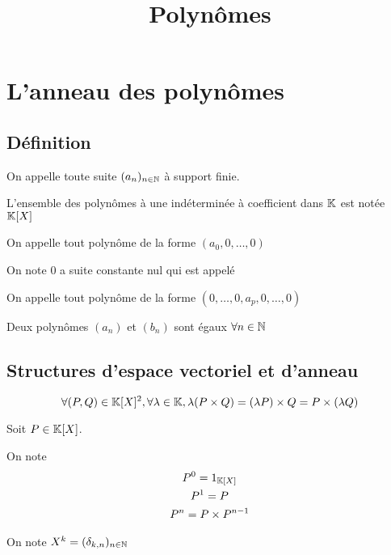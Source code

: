 

\title{Polynômes}



\section{L'anneau des polynômes}

\subsection{Définition}

\begin{dfn}
  On appelle  toute suite $(a_n)_{n \in \mathbb{N}}$
  à support finie.
\end{dfn}

\begin{dfn}
  L'ensemble des polynômes à une indéterminée à coefficient dans $\mathbb{K}$ est notée $\mathbb{K}[X]$ 

  On appelle  tout polynôme de la forme $(a_0, 0, \ldots, 0)$

  On note $0$ a suite constante nul qui est appelé 

  On appelle  tout polynôme de la forme $(0, \ldots, 0, a_p, 0, \ldots, 0)$

  Deux polynômes $(a_n)$ et $(b_n)$ sont égaux \ssi $\forall n \in \mathbb{N}$
\end{dfn}

\subsection{Structures d'espace vectoriel et d'anneau}

\begin{prp}
  \[
    \forall (P, Q) \in \mathbb{K}[X]^2, \forall \lambda \in \mathbb{K}, \lambda (P \times Q) = (\lambda P) \times Q = P \times (\lambda Q)
  \]
\end{prp}

\begin{dfn}
  Soit $P \in \mathbb{K}[X]$.

  On note
  \begin{gather*}
    P^0 = 1_{\mathbb{K}[X]} \\
    P^1 = P \\
    P^n = P \times P^{n - 1}
  \end{gather*}

  On note $X^k = (\delta_{k, n})_{n \in \mathbb{N}}$
\end{dfn}

